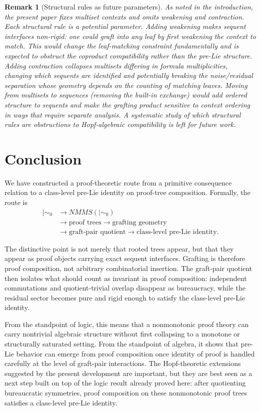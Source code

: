 \documentclass[11pt]{article}
\newtheorem{remark}[theorem]{Remark}
\newcommand{\mszero}{\mathrel{\mid\!\sim_{0}}}
\newcommand{\NMMS}{\mathit{NMMS}}
\begin{document}
\begin{remark}[Structural rules as future parameters]
As noted in the introduction, the present paper fixes multiset contexts and
omits weakening and contraction. Each structural rule is a potential parameter.
Adding weakening makes sequent interfaces non-rigid: one could graft into any
leaf by first weakening the context to match. This would change the leaf-matching
constraint fundamentally and is expected to obstruct the coproduct compatibility
rather than the pre-Lie structure. Adding contraction collapses multisets
differing in formula multiplicities, changing which sequents are identified and
potentially breaking the noise/residual separation whose geometry depends on
the counting of matching leaves. Moving from multisets to sequences (removing
the built-in exchange) would add ordered structure to sequents and make the
grafting product sensitive to context ordering in ways that require separate
analysis. A systematic study of which structural rules are obstructions to
Hopf-algebraic compatibility is left for future work.
\end{remark}

\fi

\section{Conclusion}

We have constructed a proof-theoretic route from a primitive consequence
relation to a class-level pre-Lie identity on proof-tree composition.
Formally, the route is
\[
\begin{aligned}
\mszero
&\longrightarrow \NMMS(\mszero)\\
&\longrightarrow \text{proof trees}
\longrightarrow \text{grafting geometry}\\
&\longrightarrow \text{graft-pair quotient}
\longrightarrow \text{class-level pre-Lie identity}.
\end{aligned}
\]

The distinctive point is not merely that rooted trees appear, but that they
appear as proof objects carrying exact sequent interfaces. Grafting is
therefore proof composition, not arbitrary combinatorial insertion. The
graft-pair quotient then isolates what should count as invariant in proof
composition: independent commutations and quotient-trivial overlap disappear as
bureaucracy, while the residual sector becomes pure and rigid enough to satisfy
the class-level pre-Lie identity.

From the standpoint of logic, this means that a nonmonotonic proof theory can
carry nontrivial algebraic structure without first collapsing to a monotone or
structurally saturated setting. From the standpoint of algebra, it shows that
pre-Lie behavior can emerge from proof composition once identity of proof is
handled carefully at the level of graft-pair interactions. The Hopf-theoretic
extensions suggested by the present development are important, but they are
best seen as a next step built on top of the logic result already proved here:
after quotienting bureaucratic symmetries, proof composition on these
nonmonotonic proof trees satisfies a class-level pre-Lie identity.
\end{document}
